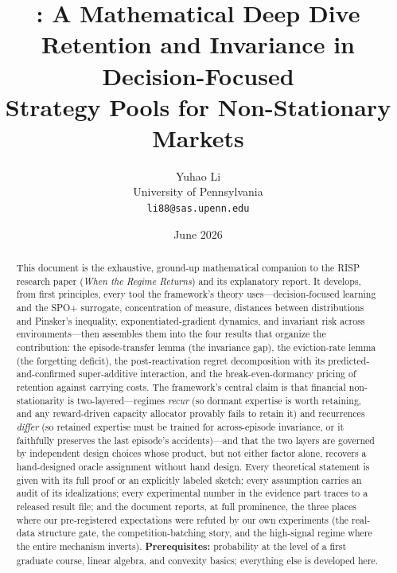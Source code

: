\documentclass[11pt,a4paper]{article}
\title{\Huge\textbf{\nm{}: A Mathematical Deep Dive}\\[0.5cm]
\Large Retention and Invariance in Decision-Focused\\
Strategy Pools for Non-Stationary Markets}
\author{Yuhao Li\\
University of Pennsylvania\\
\texttt{li88@sas.upenn.edu}}
\date{June 2026}
\theoremstyle{definition}
\theoremstyle{plain}
\newcommand{\nm}{\textsc{RISP}}
\begin{document}
\maketitle

\begin{abstract}
This document is the exhaustive, ground-up mathematical companion to the
\nm{} research paper (\emph{When the Regime Returns}) and its explanatory
report. It develops, from first principles, every tool the framework's
theory uses---decision-focused learning and the SPO+ surrogate,
concentration of measure, distances between distributions and Pinsker's
inequality, exponentiated-gradient dynamics, and invariant risk across
environments---then assembles them into the four results that organize the
contribution: the episode-transfer lemma (the invariance gap), the
eviction-rate lemma (the forgetting deficit), the post-reactivation regret
decomposition with its predicted-and-confirmed super-additive interaction,
and the break-even-dormancy pricing of retention against carrying costs.
The framework's central claim is that financial non-stationarity is
two-layered---regimes \emph{recur} (so dormant expertise is worth
retaining, and any reward-driven capacity allocator provably fails to
retain it) and recurrences \emph{differ} (so retained expertise must be
trained for across-episode invariance, or it faithfully preserves the last
episode's accidents)---and that the two layers are governed by independent
design choices whose product, but not either factor alone, recovers a
hand-designed oracle assignment without hand design. Every theoretical
statement is given with its full proof or an explicitly labeled sketch;
every assumption carries an audit of its idealizations; every experimental
number in the evidence part traces to a released result file; and the
document reports, at full prominence, the three places where our
pre-registered expectations were refuted by our own experiments (the
real-data structure gate, the competition-batching story, and the
high-signal regime where the entire mechanism inverts). \textbf{Prerequisites:}
probability at the level of a first graduate course, linear algebra, and
convexity basics; everything else is developed here.
\end{abstract}

\tableofcontents
\newpage
\end{document}

